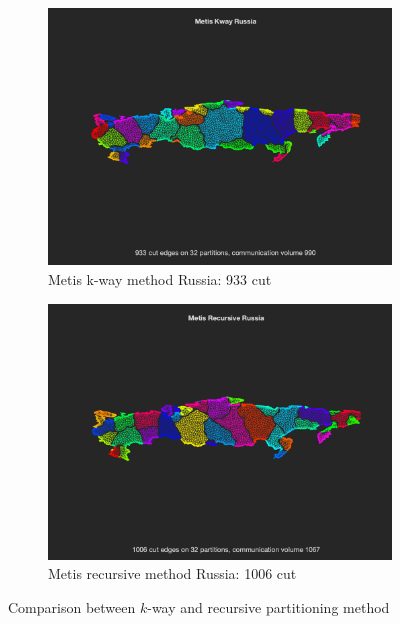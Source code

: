 \documentclass[unicode,11pt,a4paper,oneside,numbers=endperiod,openany]{scrartcl}
\begin{document}
\begin{figure}[h!]
\begin{subfigure}[b]{0.45\textwidth}
	\includegraphics[width=\textwidth]{images/metis_kway_russia.png}
	\caption{Metis k-way method Russia: 933 cut}
	\end{subfigure}
	\hfill
	\begin{subfigure}[b]{0.45\textwidth}
	\includegraphics[width=\textwidth]{images/metis_rec_russia.png}
	\caption{Metis recursive method Russia: 1006 cut}
	\end{subfigure}
	\caption{Comparison between $k$-way and recursive partitioning method}
	\label{fig:recKway}
\end{figure}
\end{document}
